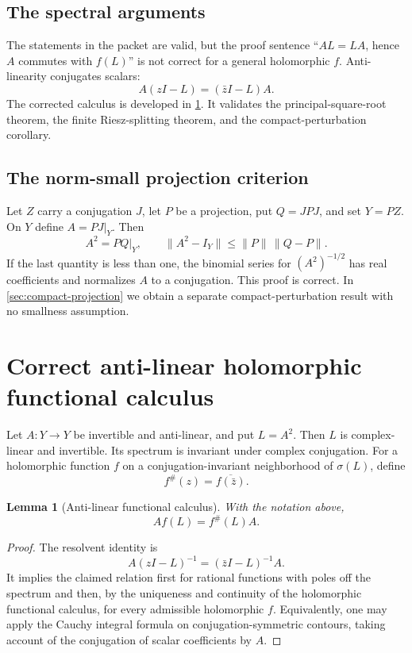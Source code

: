 \documentclass[11pt]{article}
\newtheorem{lemma}[theorem]{Lemma}
\theoremstyle{definition}
\theoremstyle{remark}
\newcommand{\spec}{\sigma}
\begin{document}
\subsection{The spectral arguments}

The statements in the packet are valid, but the proof sentence ``$AL=LA$, hence $A$ commutes with $f(L)$'' is not correct for a general holomorphic $f$. Anti-linearity conjugates scalars:
\[
       A(zI-L)=(\bar zI-L)A.
\]
The corrected calculus is developed in \cref{sec:functional-calculus}. It validates the principal-square-root theorem, the finite Riesz-splitting theorem, and the compact-perturbation corollary.

\subsection{The norm-small projection criterion}

Let $Z$ carry a conjugation $J$, let $P$ be a projection, put $Q=JPJ$, and set $Y=PZ$. On $Y$ define $A=PJ|_Y$. Then
\[
 A^2=PQ|_Y,
 \qquad
 \|A^2-I_Y\|\leq \|P\|\,\|Q-P\|.
\]
If the last quantity is less than one, the binomial series for $(A^2)^{-1/2}$ has real coefficients and normalizes $A$ to a conjugation. This proof is correct. In \cref{sec:compact-projection} we obtain a separate compact-perturbation result with no smallness assumption.

\section{Correct anti-linear holomorphic functional calculus}\label{sec:functional-calculus}

Let $A:Y\to Y$ be invertible and anti-linear, and put $L=A^2$. Then $L$ is complex-linear and invertible. Its spectrum is invariant under complex conjugation. For a holomorphic function $f$ on a conjugation-invariant neighborhood of $\spec(L)$, define
\[
       f^{\#}(z)=\overline{f(\bar z)}.
\]

\begin{lemma}[Anti-linear functional calculus]\label{lem:sharp-calculus}
With the notation above,
\[
       A f(L)=f^{\#}(L)A.
\]
\end{lemma}

\begin{proof}
The resolvent identity is
\[
 A(zI-L)^{-1}=(\bar zI-L)^{-1}A.
\]
It implies the claimed relation first for rational functions with poles off the spectrum and then, by the uniqueness and continuity of the holomorphic functional calculus, for every admissible holomorphic $f$. Equivalently, one may apply the Cauchy integral formula on conjugation-symmetric contours, taking account of the conjugation of scalar coefficients by $A$.
\end{proof}
\end{document}
